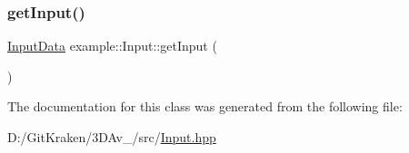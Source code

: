 \mbox{\label{classexample_1_1_input_a9db162ac185cdf3a9f77fb9c49158f51}} 
\subsubsection{\texorpdfstring{get\+Input()}{getInput()}}
{\footnotesize\ttfamily \mbox{\hyperlink{classexample_1_1_input_a574fd91f61d018474389e778c31e0da2}{Input\+Data}} example\+::\+Input\+::get\+Input (\begin{DoxyParamCaption}{ }\end{DoxyParamCaption})\hspace{0.3cm}{\ttfamily [inline]}}



The documentation for this class was generated from the following file\+:\begin{DoxyCompactItemize}
\item 
D\+:/\+Git\+Kraken/3\+D\+Av\+\_/src/\mbox{\hyperlink{_input_8hpp}{Input.\+hpp}}\end{DoxyCompactItemize}
